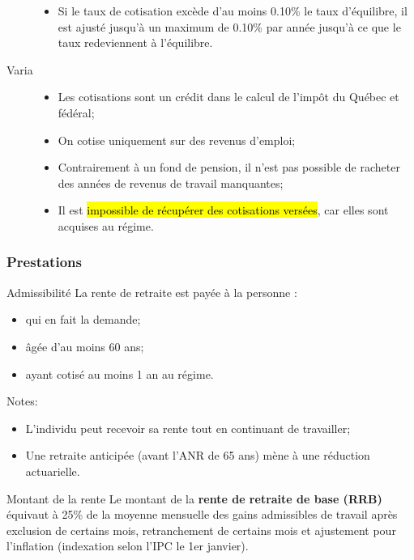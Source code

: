 \documentclass[10pt, french]{article}
\begin{document}
\begin{multicols*}{3}
\begin{description}
		\begin{itemize}[leftmargin = *]
		\item	Si le taux de cotisation excède d'au moins 0.10\% le taux d'équilibre, il est ajusté jusqu'à un maximum de 0.10\% par année jusqu'à ce que le taux redeviennent à l'équilibre.
		\end{itemize}
	\item[Varia]
		\begin{itemize}[leftmargin = *]
			\item	Les cotisations sont un crédit dans le calcul de l'impôt du \textcolor{blue(pigment)}{Québec} et \textcolor{bulgarianrose}{fédéral};
			\item	On cotise uniquement sur des revenus d'emploi;
			\item	Contrairement à un fond de pension, il n'est pas possible de racheter des années de revenus de travail manquantes;
			\item	Il est \hl{impossible de récupérer des cotisations versées}, car elles sont acquises au régime.
		\end{itemize}
\end{description}

\columnbreak

\subsubsection*{Prestations}

\begin{conceptgen}{Admissibilité}
La rente de retraite est payée à la personne :
\begin{itemize}[leftmargin = *]
	\item	qui en fait la demande;
	\item	âgée d'au moins 60 ans;
	\item	ayant cotisé au moins 1 an au régime.
\end{itemize}
\tcbline
Notes:
\begin{itemize}[leftmargin = *]
	\item	L'individu peut recevoir sa rente tout en continuant de travailler;
	\item	Une retraite anticipée (avant l'ANR de 65 ans) mène à une réduction actuarielle.
\end{itemize}
\end{conceptgen}

\begin{conceptgen}{Montant de la rente}
Le montant de la \textbf{rente de retraite de base (RRB)} équivaut à 25\% de la moyenne mensuelle des gains admissibles de travail après exclusion de certains mois, retranchement de certains mois et ajustement pour l'inflation (indexation selon l'IPC le 1er janvier).
\end{conceptgen}


\end{multicols*}
\end{document}
